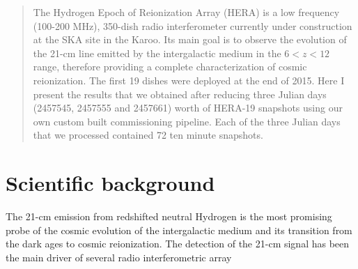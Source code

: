 \documentclass[a0,portrait]{a0poster}
\begin{document}

\begin{multicols}{2} %


\color{Navy} %

\begin{abstract}
The Hydrogen Epoch of Reionization Array (HERA) is a low frequency (100-200 MHz), 350-dish radio interferometer currently under construction at the SKA site in the Karoo. Its main goal is to observe the evolution of the 21-cm line emitted by the intergalactic medium in the $6 < z < 12$ range, therefore providing a complete characterization of cosmic reionization. The first 19 dishes were deployed at the end of 2015. 
Here I present the results that we obtained after reducing three Julian days (2457545, 2457555 and 2457661) worth of HERA-19 snapshots using our own custom built commissioning pipeline. Each of the three Julian days that we processed
contained 72 ten minute snapshots.
\end{abstract}

\section{Scientific background}
The 21-cm emission from redshifted neutral Hydrogen is the most promising probe of the cosmic evolution of the intergalactic medium and its transition from the dark ages to cosmic reionization. The detection of the 21-cm signal has been the main driver of several radio interferometric array 











\end{multicols}
\end{document}
